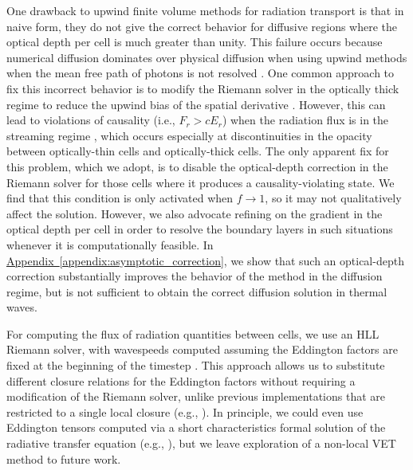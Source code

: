 \documentclass[fleqn,usenatbib]{mnras}
\newcommand{\aref}[1]{\hyperref[#1]{Appendix~\ref{#1}}}
\begin{document}
One drawback to upwind finite volume methods for radiation transport is that in naive form, they do not give the correct behavior for diffusive regions where the optical depth per cell is much greater than unity. This failure occurs because numerical diffusion dominates over physical diffusion when using upwind methods when the mean free path of photons is not resolved \citep{Lowrie_2001}. One common approach to fix this incorrect behavior is to modify the Riemann solver in the optically thick regime to reduce the upwind bias of the spatial derivative \citep{Audit_2002,Skinner_2019,Mezzacappa_2020}. However, this can lead to violations of causality (i.e., $F_r > cE_r$) when the radiation flux is in the streaming regime \citep{Audit_2002}, which occurs especially at discontinuities in the opacity between optically-thin cells and optically-thick cells. The only apparent fix for this problem, which we adopt, is to disable the optical-depth correction in the Riemann solver for those cells where it produces a causality-violating state. We find that this condition is only activated when $f \rightarrow 1$, so it may not qualitatively affect the solution. However, we also advocate refining on the gradient in the optical depth per cell in order to resolve the boundary layers in such situations whenever it is computationally feasible. In \aref{appendix:asymptotic_correction}, we show that such an optical-depth correction substantially improves the behavior of the method in the diffusion regime, but is not sufficient to obtain the correct diffusion solution in thermal waves.

For computing the flux of radiation quantities between cells, we use an HLL Riemann solver, with wavespeeds computed assuming the Eddington factors are fixed at the beginning of the timestep \citep{Balsara_1999}. This approach allows us to substitute different closure relations for the Eddington factors without requiring a modification of the Riemann solver, unlike previous implementations that are restricted to a single local closure (e.g., \citealt{Gonzalez_2007,Skinner_2013,Skinner_2019}). In principle, we could even use Eddington tensors computed via a short characteristics formal solution of the radiative transfer equation (e.g., \citealt{Davis_2012}), but we leave exploration of a non-local VET method to future work.
\end{document}
